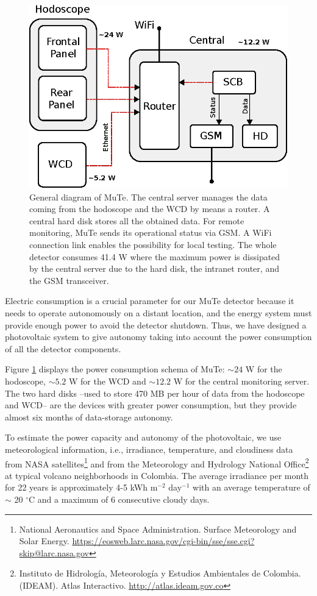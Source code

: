 \documentclass[letterpaper,11pt]{article}
\begin{document}
\begin{figure}[htb]
\centering
\includegraphics[width=0.6\columnwidth]{Figures/Total.eps}
\caption{General diagram of MuTe. The central server manages the data coming from the hodoscope and the WCD by means a router.  A central hard disk stores all the obtained data. For remote monitoring, MuTe sends its operational status via GSM. A WiFi connection link enables the possibility for local testing. The whole detector consumes 41.4 W where the maximum power is dissipated by the central server due to the hard disk, the intranet router, and the GSM transceiver.}
\label{fig:power}
\end{figure}

Electric consumption is a crucial parameter for our MuTe detector because it needs to operate autonomously on a distant location, and the energy system must provide enough power to avoid the detector shutdown. Thus, we have designed a photovoltaic system to give autonomy taking into account the power consumption of all the detector components. 

Figure \ref{fig:power} displays the power consumption schema of MuTe: $\sim 24$ W for the hodoscope,  $\sim 5.2$ W for the WCD  and $\sim 12.2$ W for the central monitoring server. The two hard disks  --used to store 470 MB per hour of data from the hodoscope and WCD-- are the devices with greater power consumption, but they provide almost six months of data-storage autonomy.

To estimate the power capacity and autonomy of the photovoltaic, we use meteorological information, i.e., irradiance, temperature, and cloudiness data from NASA satellites\footnote{National Aeronautics and Space Administration. Surface Meteorology and Solar Energy. \url{https://eosweb.larc.nasa.gov/cgi-bin/sse/sse.cgi?skip@larc.nasa.gov}} and from the Meteorology and Hydrology National Office\footnote{Instituto de Hidrología, Meteorología y Estudios Ambientales de Colombia. (IDEAM). Atlas Interactivo. \url{http://atlas.ideam.gov.co}} at typical volcano neighborhoods in Colombia. The average irradiance per month for 22 years is approximately 4-5 kWh m$^{-2}$ day$^{-1}$ with an average temperature of $\sim$ 20 $^{\circ}$C and a maximum of 6 consecutive cloudy days.
\end{document}
